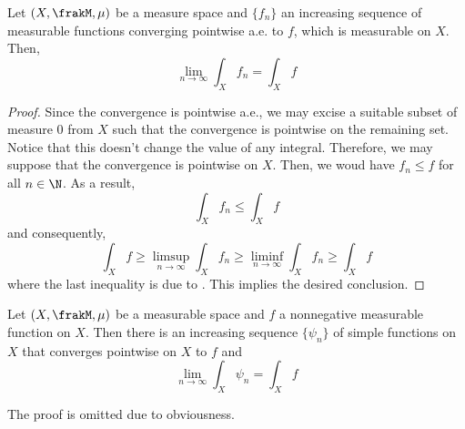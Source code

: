 \begin{theorem}
    Let $(X,\frakM,\mu)$ be a measure space and $\{f_n\}$ an increasing sequence of measurable functions converging pointwise a.e. to $f$, which is measurable on $X$. Then, 
    \begin{equation*}
        \lim_{n\to\infty}\int_X f_n = \int_X f
    \end{equation*}
\end{theorem}
\begin{proof}
    Since the convergence is pointwise a.e., we may excise a suitable subset of measure 0 from $X$ such that the convergence is pointwise on the remaining set. Notice that this doesn't change the value of any integral. Therefore, we may suppose that the convergence is pointwise on $X$. Then, we woud have $f_n\le f$ for all $n\in\N$. As a result, 
    \begin{equation*}
        \int_Xf_n\le\int_X f
    \end{equation*}
    and consequently, 
    \begin{equation*}
        \int_Xf\ge\limsup_{n\to\infty}\int_X f_n\ge\liminf_{n\to\infty}\int_X f_n\ge\int_X f
    \end{equation*}
    where the last inequality is due to . This implies the desired conclusion.
\end{proof}

\begin{corollary}
    Let $(X,\frakM,\mu)$ be a measurable space and $f$ a nonnegative measurable function on $X$. Then there is an increasing sequence $\{\psi_n\}$ of simple functions on $X$ that converges pointwise on $X$ to $f$ and 
    \begin{equation*}
        \lim_{n\to\infty}\int_X\psi_n = \int_X f
    \end{equation*}
\end{corollary}

The proof is omitted due to obviousness.

